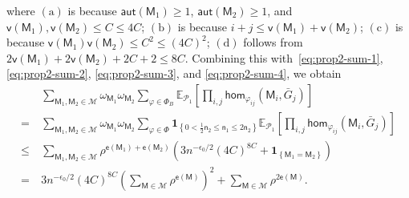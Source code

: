 \documentclass[letterpaper,11pt]{article}
\theoremstyle{definition}
\newcommand{\maM}{\mathcal{M}}
\newcommand{\maP}{\mathcal{P}}
\newcommand{\en}{\mathsf{{e}}}
\newcommand{\vn}{\mathsf{{v}}}
\newcommand{\pth}[1]{\left( #1 \right)}
\newcommand{\qth}[1]{\left[ #1 \right]}
\newcommand{\sfM}{{\mathsf{M}}}
\newcommand{\sfn}{{\mathsf{n}}}
\newcommand{\indc}[1]{{\mathbf{1}_{\left\{{#1}\right\}}}}
\newcommand{\aut}{\mathsf{aut}}
\renewcommand{\hom}{\mathsf{hom}}
\newcommand{\vp}{\varphi}
\def\E{\mathbb{E}}
\begin{document}
where $\mathrm{(a)}$ is because  $\aut(\sfM_1)\ge 1$,  $\aut(\sfM_2)\ge 1$, and $\vn(\sfM_1),\vn(\sfM_2)\le C\le 4C$; $\mathrm{(b)}$ is because $i+j\le \vn(\sfM_1)+\vn(\sfM_2)$; $\mathrm{(c)}$ is because $\vn(\sfM_1)\vn(\sfM_2) \le C^2\le \pth{4C}^2$; $\mathrm{(d)}$ follows from $2\vn(\sfM_1)+2\vn(\sfM_2)+2C+2\le 8C$. Combining this with~\eqref{eq:prop2-sum-1}, \eqref{eq:prop2-sum-2}, \eqref{eq:prop2-sum-3}, and \eqref{eq:prop2-sum-4}, we obtain \begin{align}
    \nonumber &~\sum_{\sfM_1,\sfM_2\in \maM}\omega_{\sfM_1}\omega_{\sfM_2}\sum_{\vp\in \Phi_B} \E_{\maP_1}\qth{\prod_{i,j}\hom_{\vp_{ij}}(\sfM_i,\bar{G}_j)}\\\nonumber =&~\sum_{\sfM_1,\sfM_2\in \maM}\omega_{\sfM_1}\omega_{\sfM_2}\sum_{\vp\in \Phi} \indc{0<\frac{1}{2}\sfn_2\le \sfn_1\le 2\sfn_2} \E_{\maP_1}\qth{\prod_{i,j}\hom_{\vp_{ij}}(\sfM_i,\bar{G}_j)}\\\nonumber \le&~\sum_{\sfM_1,\sfM_2\in \maM} \rho^{\en(\sfM_1)+\en(\sfM_2)}\pth{3n^{-\epsilon_0/2} (4C)^{8C}+\indc{\sfM_1 = \sfM_2}} \\\label{eq:term2}=&~ 3n^{-\epsilon_0/2} (4C)^{8C} \pth{\sum_{\sfM\in \maM} \rho^{\en(\sfM)}}^2+\sum_{\sfM\in\maM} \rho^{2\en(\sfM)}. 
\end{align}
\end{document}
